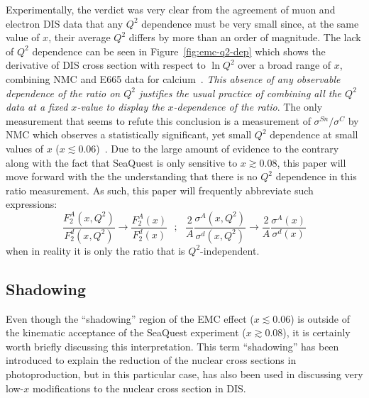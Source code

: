 Experimentally, the verdict was very clear from the agreement of muon and electron DIS data that any $Q^2$ dependence must be very small since, at the same value of $x$, their average $Q^2$ differs by more than an order of magnitude. The lack of $Q^2$ dependence can be seen in Figure~\ref{fig:emc-q2-dep} which shows the derivative of DIS cross section with respect to $\ln Q^2$ over a broad range of $x$, combining NMC and E665 data for calcium~\cite{Geesaman:1995yd}.  \emph{This absence of any observable dependence of the ratio on $Q^2$ justifies the usual practice of combining all the $Q^2$ data at a fixed $x$-value to display the $x$-dependence of the ratio}. The only measurement that seems to refute this conclusion is a measurement of $\sigma^{Sn}/\sigma^C$ by NMC which observes a statistically significant, yet small $Q^2$ dependence at small values of $x$ ($x\lesssim 0.06$)~\cite{Arneodo:1996qe}. Due to the large amount of evidence to the contrary along with the fact that SeaQuest is only sensitive to $x\gtrsim0.08$, this paper will move forward with the the understanding that there is no $Q^2$ dependence in this ratio measurement. As such, this paper will frequently abbreviate such expressions:
\begin{equation}
\frac{F_2^A(x, Q^2)}{F_2^d(x, Q^2)} \rightarrow \frac{F_2^A(x)}{F_2^d(x)}\ \ \ ;\ \ \ \frac{2}{A}\frac{\sigma^A(x, Q^2)}{\sigma^d(x, Q^2)} \rightarrow \frac{2}{A} \frac{\sigma^A(x)}{\sigma^d(x)}
\end{equation}
when in reality it is only the ratio that is $Q^2$-independent.

\subsection{Shadowing}\label{sec:shadowing}

Even though the ``shadowing'' region of the EMC effect ($x\lesssim 0.06$) is outside of the kinematic acceptance of the SeaQuest experiment ($x\gtrsim0.08$), it is certainly worth briefly discussing this interpretation. This term ``shadowing'' has been introduced to explain the reduction of the nuclear cross sections in photoproduction, but in this particular case, has also been used in discussing very low-$x$ modifications to the nuclear cross section in DIS. 

